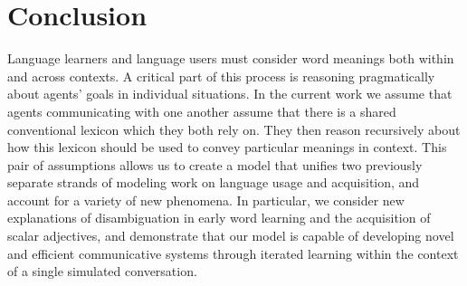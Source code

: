 \documentclass{article} %
\begin{document}
%




\section{Conclusion}

Language learners and language users must consider word meanings both
within and across contexts. A critical part of this process is
reasoning pragmatically about agents' goals in individual
situations. In the current work we assume that agents communicating
with one another assume that there is a shared conventional lexicon
which they both rely on. They then
reason recursively about how this lexicon should be used to convey
particular meanings in context. This pair of assumptions allows us to
create a model that unifies two previously separate strands
of modeling work on language usage and acquisition, and account for a
variety of new phenomena. In particular, we consider new
explanations of disambiguation in early word learning and the acquisition of
scalar adjectives, and demonstrate that our model is capable of developing
novel and efficient communicative systems through iterated learning
within the context of a single simulated conversation.
\end{document}
